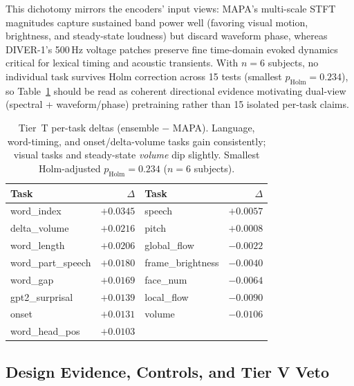 \documentclass[11pt]{article}
\begin{document}
This dichotomy mirrors the encoders' input views: MAPA's multi-scale STFT magnitudes capture sustained band power well (favoring visual motion, brightness, and steady-state loudness) but discard waveform phase, whereas DIVER-1's 500\,Hz voltage patches preserve fine time-domain evoked dynamics critical for lexical timing and acoustic transients. With $n=6$ subjects, no individual task survives Holm correction across 15 tests (smallest $p_{\mathrm{Holm}}=0.234$), so Table~\ref{tab:tasks} should be read as coherent directional evidence motivating dual-view (spectral + waveform/phase) pretraining rather than 15 isolated per-task claims.

\begin{table}[htbp]\centering\small
\begin{tabular}{lr@{\qquad}lr}\toprule
Task & $\Delta$ & Task & $\Delta$\\\midrule
word\_index & $+0.0345$ & speech & $+0.0057$\\
delta\_volume & $+0.0216$ & pitch & $+0.0008$\\
word\_length & $+0.0206$ & global\_flow & $-0.0022$\\
word\_part\_speech & $+0.0180$ & frame\_brightness & $-0.0040$\\
word\_gap & $+0.0169$ & face\_num & $-0.0064$\\
gpt2\_surprisal & $+0.0139$ & local\_flow & $-0.0090$\\
onset & $+0.0131$ & volume & $-0.0106$\\
word\_head\_pos & $+0.0103$ & & \\\bottomrule
\end{tabular}
\caption{Tier~T per-task deltas (ensemble $-$ MAPA). Language, word-timing, and onset/delta-volume tasks gain consistently; visual tasks and steady-state \emph{volume} dip slightly. Smallest Holm-adjusted $p_{\mathrm{Holm}}=0.234$ ($n=6$ subjects).}
\label{tab:tasks}
\end{table}

\subsection{Design Evidence, Controls, and Tier V Veto}
\end{document}
